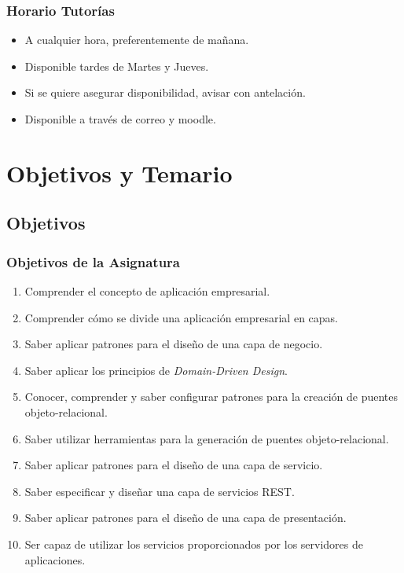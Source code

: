 \documentclass[a4paper,t,xcolor=pst,dvips,colortheme]{beamer}
\begin{document}
\begin{frame}[c]
	\frametitle{Horario Tutorías}
    \begin{itemize}[<+->]
        \item A cualquier hora, preferentemente de mañana.
        \item Disponible tardes de Martes y Jueves.
        \item Si se quiere asegurar disponibilidad, avisar con antelación.
        \item Disponible a través de correo y \alert{moodle}.
	\end{itemize}
\end{frame}

\section{Objetivos y Temario}

\subsection{Objetivos}

\begin{frame}[c]
   \frametitle{Objetivos de la Asignatura}
   \begin{enumerate}[<+->]
        \item Comprender el concepto de aplicación empresarial.
        \item Comprender cómo se divide una aplicación empresarial en capas.
        \item Saber aplicar patrones para el diseño de una capa de negocio.
        \item Saber aplicar los principios de \emph{Domain-Driven Design}.
        \item Conocer, comprender y saber configurar patrones para la creación de puentes objeto-relacional.
        \item Saber utilizar herramientas para la generación de puentes objeto-relacional.
        \item Saber aplicar patrones para el diseño de una capa de servicio.
        \item Saber especificar y diseñar una capa de servicios REST.
        \item Saber aplicar patrones para el diseño de una capa de presentación.
        \item Ser capaz de utilizar los servicios proporcionados por los servidores de aplicaciones.
	\end{enumerate}
\end{frame}
\end{document}
